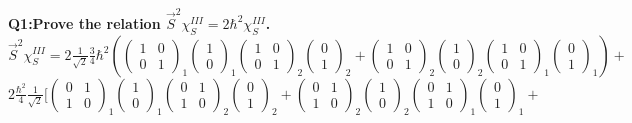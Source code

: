 \documentclass{article}
\begin{document}
\noindent \textbf{Q1:Prove the relation $\vec{S}^2\chi^{III}_S=2\hbar^2\chi^{III}_S$.}\\
\noindent $\vec{S}^2\chi^{III}_S=2\frac{1}{\sqrt{2}}\frac{3}{4}\hbar^2(\begin{pmatrix}1 & 0 \\ 0 & 1\end{pmatrix}_1\begin{pmatrix}1 \\ 0 \end{pmatrix}_1\begin{pmatrix}1 & 0 \\ 0 & 1\end{pmatrix}_2\begin{pmatrix}0 \\ 1 \end{pmatrix}_2+\begin{pmatrix}1 & 0 \\ 0 & 1\end{pmatrix}_2\begin{pmatrix}1 \\ 0 \end{pmatrix}_2\begin{pmatrix}1 & 0 \\ 0 & 1\end{pmatrix}_1\begin{pmatrix}0 \\ 1 \end{pmatrix}_1)+$\\
\noindent $2\frac{\hbar^2}{4}\frac{1}{\sqrt{2}}[\begin{pmatrix}0 & 1 \\ 1 & 0\end{pmatrix}_1\begin{pmatrix}1 \\ 0 \end{pmatrix}_1\begin{pmatrix}0 & 1 \\ 1 & 0\end{pmatrix}_2\begin{pmatrix}0 \\ 1 \end{pmatrix}_2+\begin{pmatrix}0 & 1 \\ 1 & 0\end{pmatrix}_2\begin{pmatrix}1 \\ 0 \end{pmatrix}_2\begin{pmatrix}0 & 1 \\ 1 & 0\end{pmatrix}_1\begin{pmatrix}0 \\ 1 \end{pmatrix}_1+$\\
\end{document}

